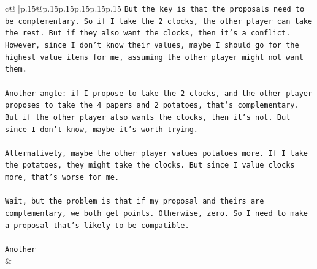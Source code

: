 \documentclass{article}
\begin{document}
{\begin{supertabular}{c@{$\;$}|p{.15\linewidth}@{}p{.15\linewidth}p{.15\linewidth}p{.15\linewidth}p{.15\linewidth}p{.15\linewidth}}
{{{\texttt{But the key is that the proposals need to be complementary. So if I take the 2 clocks, the other player can take the rest. But if they also want the clocks, then it's a conflict. However, since I don't know their values, maybe I should go for the highest value items for me, assuming the other player might not want them.} \\
\\ 
\texttt{Another angle: if I propose to take the 2 clocks, and the other player proposes to take the 4 papers and 2 potatoes, that's complementary. But if the other player also wants the clocks, then it's not. But since I don't know, maybe it's worth trying.} \\
\\ 
\texttt{Alternatively, maybe the other player values potatoes more. If I take the potatoes, they might take the clocks. But since I value clocks more, that's worse for me.} \\
\\ 
\texttt{Wait, but the problem is that if my proposal and theirs are complementary, we both get points. Otherwise, zero. So I need to make a proposal that's likely to be compatible.} \\
\\ 
\texttt{Another} \\
            }
        }
    }
    & \\ \\


\end{supertabular}}
\end{document}
